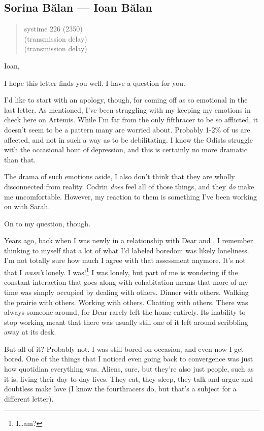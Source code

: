 \hypertarget{sorina-bux103lan-ioan-bux103lan}{%
\subsection{Sorina Bălan — Ioan Bălan}\label{sorina-bux103lan-ioan-bux103lan}}

\begin{quote}
systime 226 (2350)\\
(transmission delay)\\
(transmission delay)
\end{quote}

Ioan,

I hope this letter finds you well. I have a question for you.

I'd like to start with an apology, though, for coming off as so emotional in the last letter. As mentioned, I've been struggling with my keeping my emotions in check here on Artemis. While I'm far from the only fifthracer to be so afflicted, it doesn't seem to be a pattern many are worried about. Probably 1-2\% of us are affected, and not in such a way as to be debilitating. I know the Odists struggle with the occasional bout of depression, and this is certainly no more dramatic than that.

The drama of such emotions aside, I also don't think that they are wholly disconnected from reality. Codrin \emph{does} feel all of those things, and they \emph{do} make me uncomfortable. However, my reaction to them is something I've been working on with Sarah.

On to my question, though.

Years ago, back when I was newly in a relationship with Dear and \Partner , I remember thinking to myself that a lot of what I'd labeled boredom was likely loneliness. I'm not totally sure how much I agree with that assessment anymore. It's not that I \emph{wasn't} lonely. I was!\footnote{I\ldots{}am?} I was lonely, but part of me is wondering if the constant interaction that goes along with cohabitation means that more of my time was simply occupied by dealing with others. Dinner with others. Walking the prairie with others. Working with others. Chatting with others. There was always someone around, for Dear rarely left the home entirely. Its inability to stop working meant that there was usually still one of it left around scribbling away at its desk.

But all of it? Probably not. I was still bored on occasion, and even now I get bored. One of the things that I noticed even going back to convergence was just how quotidian everything was. Aliens, sure, but they're also just people, such as it is, living their day-to-day lives. They eat, they sleep, they talk and argue and doubtless make love (I know the fourthracers do, but that's a subject for a different letter).

